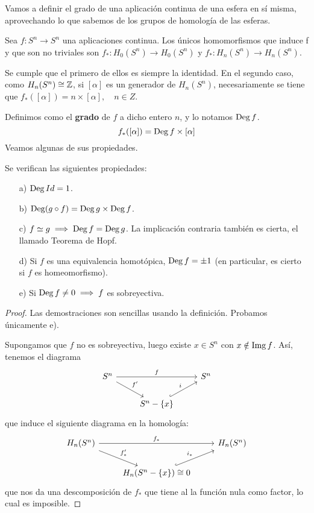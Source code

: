 Vamos a definir el grado de una aplicación continua de una esfera en sí misma, aprovechando lo que sabemos
de los grupos de homología de las esferas.

Sea $f \colon S^n \to S^n$ una aplicaciones continua. Los únicos homomorfismos que induce f y que son no triviales son
$f_* \colon H_0(S^n) \to H_0(S^n)$ y $f_* \colon H_n(S^n) \to H_n(S^n)$.

Se cumple que el primero de ellos es siempre la identidad. En el segundo caso, como $H_n(S^n) \cong \mathbb{Z}$, si $[\alpha]$ es un
generador de $H_n(S^n)$, necesariamente se tiene que $f_*([\alpha]) = n \times [\alpha], \quad n \in Z$.

Definimos como el \textbf{grado} de $f$ a dicho entero $n$, y lo notamos $\operatorname{Deg} f$.
\[ f_*([\alpha]) = \operatorname{Deg} f \times [\alpha] \]
Veamos algunas de sus propiedades.

\begin{proposition}[Propiedades]
  Se verifican las siguientes propiedades:
  \begin{itemize}
    \item[a)] $\operatorname{Deg} Id = 1$.
    \item[b)] $\operatorname{Deg} (g \circ f) = \operatorname{Deg} g \times \operatorname{Deg} f$.
    \item[c)] $f \simeq g \implies \operatorname{Deg} f = \operatorname{Deg} g$. La implicación contraria también es cierta, el llamado Teorema de Hopf.
    \item[d)] Si $f$ es una equivalencia homotópica, $\operatorname{Deg} f = \pm 1$ (en particular, es cierto si $f$ es homeomorfismo).
    \item[e)] Si $\operatorname{Deg} f \neq 0 \implies f$ es sobreyectiva.
  \end{itemize}
\end{proposition}

\begin{proof}
  Las demostraciones son sencillas usando la definición. Probamos únicamente e).

  Supongamos que $f$ no es sobreyectiva, luego existe $x \in S^n$ con $x \notin \operatorname{Img} f$. Así, tenemos el diagrama
  \[ \begin{tikzcd}
    S^n  \arrow{dr}{f'} \arrow{rr}{f} & & S^n  \\
    & S^n - \{x\} \arrow[hookrightarrow]{ur}{i}
  \end{tikzcd} \]
  que induce el siguiente diagrama en la homología:
  \[ \begin{tikzcd}
    H_n(S^n)  \arrow{dr}{f'_*} \arrow{rr}{f_*} & & H_n(S^n)  \\
    & H_n(S^n - \{x\}) \cong 0 \arrow[hookrightarrow]{ur}{i_*}
  \end{tikzcd} \]
  que nos da una descomposición de $f_*$ que tiene al la función nula como factor, lo cual es imposible.
\end{proof}

